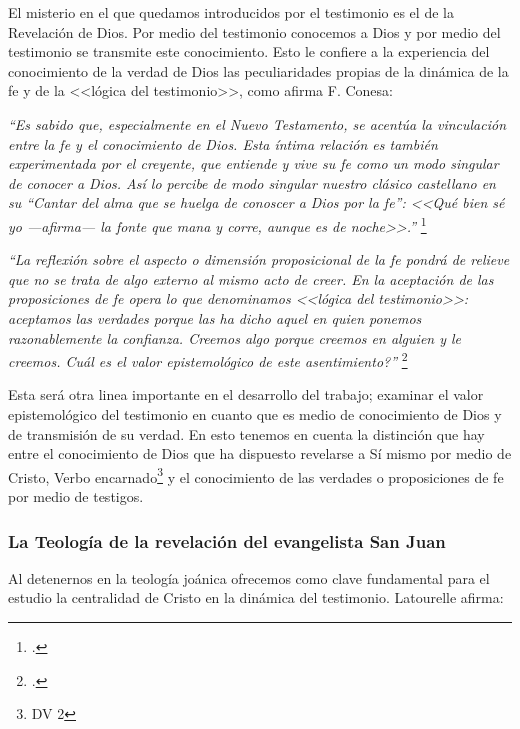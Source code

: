 \documentclass[11pt]{article}
\begin{document}
El misterio en el que quedamos introducidos por el testimonio es el de la Revelación de Dios. Por medio del testimonio conocemos a Dios y por medio del testimonio se transmite este conocimiento. Esto le confiere a la experiencia del conocimiento de la verdad de Dios las peculiaridades propias de la dinámica de la fe y de la <<lógica del testimonio>>, como afirma F. Conesa:

\emph{
``Es sabido que, especialmente en el Nuevo Testamento, se acentúa la vinculación entre la fe y el conocimiento de Dios. Esta íntima relación es también experimentada por el creyente, que entiende y vive su fe como un modo singular de conocer a Dios. Así lo percibe de modo singular nuestro clásico castellano en su ``Cantar del alma que se huelga de conoscer a Dios por la fe'': <<Qué bien sé yo ---afirma--- la fonte que mana y corre, aunque es de noche>>.''
}\footcite[15]{cyc}


\emph{
``La reflexión sobre el aspecto o dimensión proposicional de la fe pondrá de relieve que no se trata de algo externo al mismo acto de creer. En la aceptación de las proposiciones de fe opera lo que denominamos <<lógica del testimonio>>: aceptamos las verdades porque las ha dicho aquel en quien ponemos razonablemente la confianza. Creemos algo porque creemos en alguien y le creemos. \textquestiondown{}{}Cuál es el valor epistemológico de este asentimiento?''
}\footcite[p.483]{feylogicaconesa}

Esta será otra linea importante en el desarrollo del trabajo; examinar el valor epistemológico del testimonio en cuanto que es medio de conocimiento de Dios y de transmisión de su verdad. En esto tenemos en cuenta la distinción que hay entre el conocimiento de Dios que ha dispuesto revelarse a Sí mismo por medio de Cristo, Verbo encarnado\footnote{DV 2} y el conocimiento de las verdades o proposiciones de fe por medio de testigos. 

\subsubsection{La Teología de la revelación del evangelista San Juan}

Al detenernos en la teología joánica ofrecemos como clave fundamental para el estudio la centralidad de Cristo en la dinámica del testimonio. Latourelle afirma:
\end{document}
